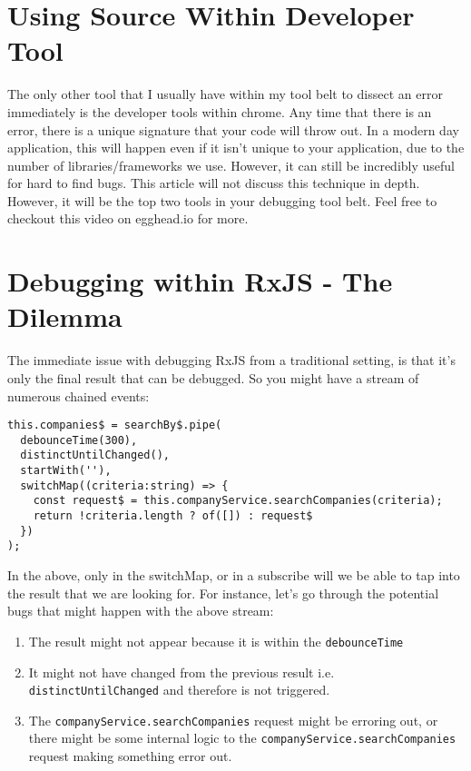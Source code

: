 
\section{Using Source Within Developer Tool}
The only other tool that I usually have within my tool belt to dissect an error immediately is the developer tools within chrome. Any time that there is an error, there is a unique signature that your code will throw out. In a modern day application, this will happen even if it isn't unique to your application, due to the number of libraries/frameworks we use. However, it can still be incredibly useful for hard to find bugs. This article will not discuss this technique in depth. However, it will be the top two tools in your debugging tool belt. Feel free to checkout this video on egghead.io for more.

\section{Debugging within RxJS - The Dilemma}
The immediate issue with debugging RxJS from a traditional setting, is that it's only the final result that can be debugged. So you might have a stream of numerous chained events: 
\begin{lstlisting}
this.companies$ = searchBy$.pipe(
  debounceTime(300),
  distinctUntilChanged(),
  startWith(''),      
  switchMap((criteria:string) => {
    const request$ = this.companyService.searchCompanies(criteria);
    return !criteria.length ? of([]) : request$          
  })
);  
\end{lstlisting}

In the above, only in the switchMap, or in a subscribe will we be able to tap into the result that we are looking for. For instance, let's go through the potential bugs that might happen with the above stream: 

\begin{enumerate}
  \item The result might not appear because it is within the \lstinline{debounceTime}
  \item It might not have changed from the previous result i.e. \lstinline{distinctUntilChanged} and therefore is not triggered.
  \item The \lstinline{companyService.searchCompanies} request might be erroring out, or there might be some internal logic to the \lstinline{companyService.searchCompanies} request making something error out.
\end{enumerate}

